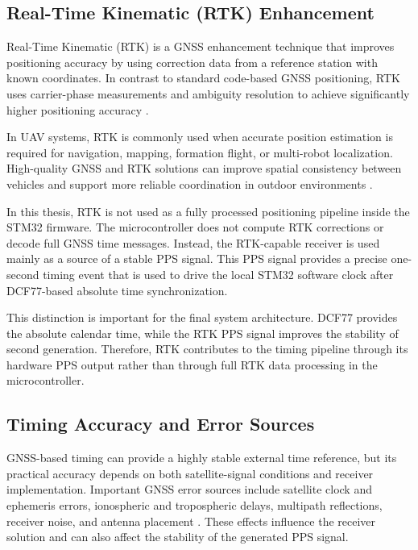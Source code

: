 \subsection{Real-Time Kinematic (RTK) Enhancement}

Real-Time Kinematic (RTK) is a GNSS enhancement technique that improves positioning accuracy by using correction data from a reference station with known coordinates. In contrast to standard code-based GNSS positioning, RTK uses carrier-phase measurements and ambiguity resolution to achieve significantly higher positioning accuracy \cite{teunissen2017springer}.

In UAV systems, RTK is commonly used when accurate position estimation is required for navigation, mapping, formation flight, or multi-robot localization. High-quality GNSS and RTK solutions can improve spatial consistency between vehicles and support more reliable coordination in outdoor environments \cite{r6}.

In this thesis, RTK is not used as a fully processed positioning pipeline inside the STM32 firmware. The microcontroller does not compute RTK corrections or decode full GNSS time messages. Instead, the RTK-capable receiver is used mainly as a source of a stable PPS signal. This PPS signal provides a precise one-second timing event that is used to drive the local STM32 software clock after DCF77-based absolute time synchronization.

This distinction is important for the final system architecture. DCF77 provides the absolute calendar time, while the RTK PPS signal improves the stability of second generation. Therefore, RTK contributes to the timing pipeline through its hardware PPS output rather than through full RTK data processing in the microcontroller.

\subsection{Timing Accuracy and Error Sources}

GNSS-based timing can provide a highly stable external time reference, but its practical accuracy depends on both satellite-signal conditions and receiver implementation. Important GNSS error sources include satellite clock and ephemeris errors, ionospheric and tropospheric delays, multipath reflections, receiver noise, and antenna placement \cite{teunissen2017springer}. These effects influence the receiver solution and can also affect the stability of the generated PPS signal.

